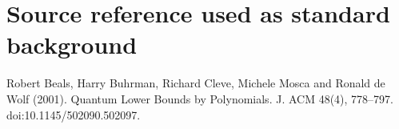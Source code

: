 \section*{Source reference used as standard background}
Robert Beals, Harry Buhrman, Richard Cleve, Michele Mosca and Ronald de Wolf (2001). Quantum Lower Bounds by Polynomials. J. ACM 48(4), 778--797. doi:10.1145/502090.502097.
